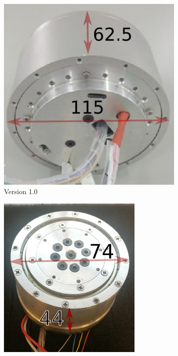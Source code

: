  \begin{figure}[htbp]
     \centering
     \begin{subfigure}[b]{0.3\textwidth}
         \centering
         \includegraphics[width=\textwidth]{figures/aktuater_minimeres1}
 		\caption{Version 1.0}
 		\label{fig:first_rev_aktuator}
     \end{subfigure}
     \hspace{1in}
     \begin{subfigure}[b]{0.3\textwidth}
         \centering
         \includegraphics[width=\textwidth]{figures/aktuater_minimeres2}

\end{subfigure}
\end{figure}
